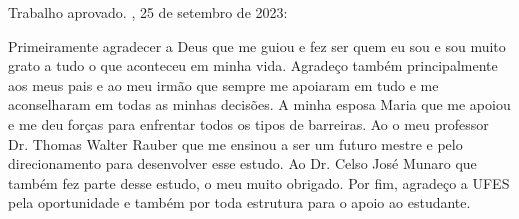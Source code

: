 \documentclass[
	12pt,				%
	openright,			%
	oneside,			%
	a4paper,			%
	english,			%
	french,				%
	spanish,			%
	brazil				%
	]{abntex2}
\begin{document}
\begin{folhadeaprovacao}
  \begin{center}
    {\ABNTEXchapterfont\large\imprimirautor}
    \vspace*{\fill}\vspace*{\fill}
    \begin{center}
      \ABNTEXchapterfont\bfseries\Large\imprimirtitulo
    \end{center}
    \vspace*{\fill}
    \hspace{.45\textwidth}
    \begin{minipage}{.5\textwidth}
      \imprimirpreambulo
    \end{minipage}%
    \vspace*{\fill}
  \end{center}
  Trabalho aprovado. \imprimirlocal, 25 de setembro de 2023:
  \begin{center}
    \vspace*{0.5cm}
    {\large\imprimirlocal}
    \par
    {\large\imprimirdata}
    \vspace*{1cm}
  \end{center}
\end{folhadeaprovacao}




\begin{agradecimentos}
  Primeiramente agradecer a Deus que me guiou e fez ser quem eu sou e sou muito grato a tudo o que aconteceu em minha vida. Agradeço também principalmente aos meus pais e ao meu irmão que sempre me apoiaram em tudo e me aconselharam em todas as minhas decisões. A minha esposa Maria que me apoiou e me deu forças para enfrentar todos os tipos de barreiras. Ao o meu professor Dr. Thomas Walter Rauber que me ensinou a ser um futuro mestre e pelo direcionamento para
  desenvolver esse estudo. Ao Dr. Celso José Munaro que também fez parte desse estudo, o meu muito obrigado. Por fim, agradeço a UFES pela oportunidade e também por toda estrutura para o apoio ao estudante.
\end{agradecimentos}
\end{document}
